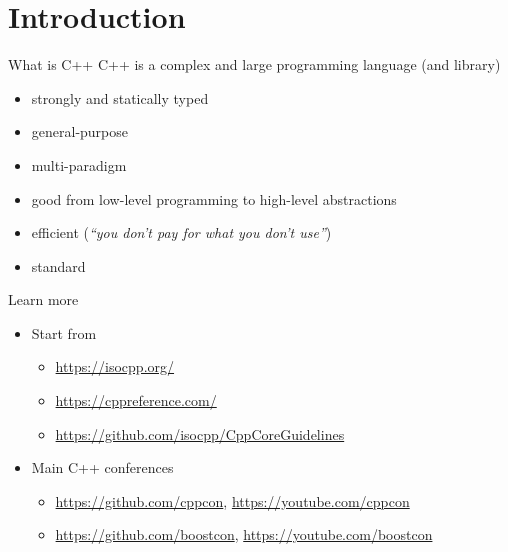 
\section{Introduction}

\begin{frame}{What is C++}
  C++ is a complex and large programming language (and library)
  \begin{itemize}[<+->]
    \item strongly and statically typed
    \item general-purpose
    \item multi-paradigm
    \item good from low-level programming to high-level abstractions
    \item efficient (\textit{``you don't pay for what you don't use''})
    \item standard
  \end{itemize}

\end{frame}

\begin{frame}{Learn more}
  \begin{itemize}
    \item Start from
      \begin{itemize}
      \item \url{https://isocpp.org/}
      \item \url{https://cppreference.com/}
      \item \url{https://github.com/isocpp/CppCoreGuidelines}
      \end{itemize}
    \item Main C++ conferences
      \begin{itemize}
      \item \url{https://github.com/cppcon}, \url{https://youtube.com/cppcon}
      \item \url{https://github.com/boostcon}, \url{https://youtube.com/boostcon}
      \end{itemize}
  \end{itemize}
\end{frame}

